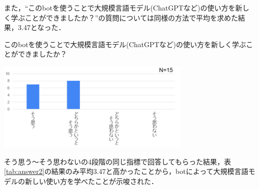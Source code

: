また，``このbotを使うことで大規模言語モデル(ChatGPTなど)の使い方を新しく学ぶことができましたか？''の質問については同様の方法で平均を求めた結果，3.47となった．

\begin{table}[H]
    \centering
    \caption{このbotを使うことで大規模言語モデル(ChatGPTなど)の使い方を新しく学ぶことができましたか？}
    \label{tab:answer2}
    \includegraphics[width=0.7\textwidth]{fig/tab3.png}
\end{table}

そう思う～そう思わないの4段階の同じ指標で回答してもらった結果，表\ref{tab:answer2}の結果のみ平均3.47と高かったことから，botによって大規模言語モデルの新しい使い方を学べたことが示唆された．




